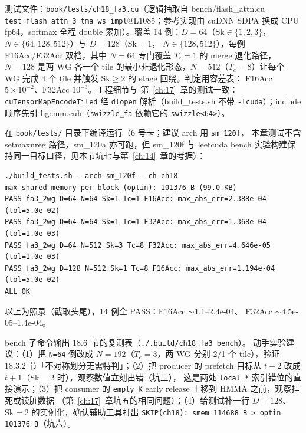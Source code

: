 测试文件：\texttt{book/\allowbreak{}tests/\allowbreak{}ch18\_\allowbreak{}fa3.cu}（逻辑抽取自 bench/flash\_attn.cu
\texttt{test\_\allowbreak{}flash\_\allowbreak{}attn\_\allowbreak{}3\_\allowbreak{}tma\_\allowbreak{}ws\_\allowbreak{}impl}@L1085；参考实现由 cuDNN SDPA 换成
CPU fp64，softmax 全程 double 累加）。覆盖 14 例：$D{=}64$（$\mathrm{Sk}
\in \{1,2,3\}$，$N \in \{64, 128, 512\}$）与 $D{=}128$（$\mathrm{Sk}{=}1$，
$N \in \{128, 512\}$），每例 F16Acc/F32Acc 双档，其中 $N{=}64$ 专门覆盖
$T_c{=}1$ 的 merge 退化路径，
$N{=}128$ 是两 WG 各一个 tile 的最小非退化形态，$N{=}512$（$T_c{=}8$）让每个
WG 完成 4 个 tile 并触发 $\mathrm{Sk}{\ge}2$ 的 stage 回绕。判定用容差表：
F16Acc $5\times10^{-2}$、F32Acc $10^{-3}$。工程细节与
第~\ref{ch:17}~章的测试一致：\texttt{cu\allowbreak{}Tensor\allowbreak{}Map\allowbreak{}Encode\allowbreak{}Tiled} 经
\texttt{dlopen} 解析（build\_tests.sh 不带 \texttt{-lcuda}）；include 顺序先引
hgemm.cuh（\texttt{swizzle\_fa} 依赖它的 \texttt{swizzle<64>}）。

在 \texttt{book/tests/} 目录下编译运行（6 号卡；建议 arch 用 \texttt{sm\_120f}，
本章测试不含 setmaxnreg 路径，sm\_120a 亦可跑，但 sm\_120f 与
leetcuda bench 实验构建保持同一目标口径，见本节坑七与第~\ref{ch:14}~章的考据）：

\begin{lstlisting}[style=console]
./build_tests.sh --arch sm_120f --ch ch18
max shared memory per block (optin): 101376 B (99.0 KB)
PASS fa3_2wg D=64 N=64 Sk=1 Tc=1 F16Acc: max_abs_err=2.388e-04 (tol=5.0e-02)
PASS fa3_2wg D=64 N=64 Sk=1 Tc=1 F32Acc: max_abs_err=1.368e-04 (tol=1.0e-03)
PASS fa3_2wg D=64 N=512 Sk=3 Tc=8 F32Acc: max_abs_err=4.646e-05 (tol=1.0e-03)
PASS fa3_2wg D=128 N=512 Sk=1 Tc=8 F16Acc: max_abs_err=1.194e-04 (tol=5.0e-02)
ALL OK
\end{lstlisting}

以上为照录（截取头尾），14 例全 PASS：F16Acc $\sim$1.1--2.4e-04、
F32Acc $\sim$4.5e-05--1.4e-04。

bench 子命令输出 18.6~节的复测表（\texttt{.\allowbreak{}/\allowbreak{}.\allowbreak{}build/\allowbreak{}ch18\_\allowbreak{}fa3 bench}）。
动手实验建议：（1）把 \texttt{N=64} 例改成 $N{=}192$（$T_c{=}3$，两 WG 分别
2/1 个 tile），验证 18.3.2 节「不对称划分无需特判」；（2）把 producer 的
prefetch 目标从 $t+2$ 改成 $t+1$（Sk$=$2 时），观察数值立刻出错（坑三），
这是两处 \texttt{local\_*} 索引错位的直接演示；（3）把 consumer 的
\texttt{empty\_K} early release 上移到 HMMA 之前，观察挂死或读脏数据
（第~\ref{ch:17}~章坑五的相同问题）；（4）给测试补一行 $D{=}128$、$\mathrm{Sk}{=}2$
的实例化，确认辅助工具打出
\texttt{SKIP(ch18): smem 114688 B > optin 101376 B}（坑六）。

